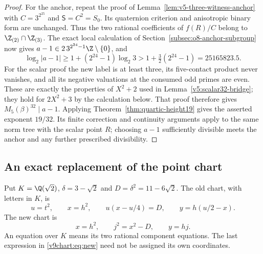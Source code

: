 \begin{proof}
For the anchor, repeat the proof of
Lemma~\ref{lem:v5-three-witness-anchor} with $C=3^{2^{25}}$ and
$\mathsf S=C^2=S_0$. Its quaternion criterion and anisotropic
binary form are unchanged. Thus the two rational coefficients of
$f(R)/C$ belong to $\Z_{(2)}\cap\Z_{(3)}$. The exact local calculation
of Section~\ref{subsec:o8-anchor-subgroup} now gives
$a-1\in2\,3^{2^{24}-1}\Z\setminus\{0\}$, and
\[
 \log_2|a-1|\ge1+(2^{24}-1)\log_2 3
 >1+\tfrac32(2^{24}-1)=25165823.5.
\]
For the scalar proof the new label is at least three, its five-contact
product never vanishes, and all its negative valuations at the
consumed odd primes are even. These are exactly the properties of
$X^2+2$ used in Lemma~\ref{v5:scalar32-bridge}; they hold for
$2X^2+3$ by the calculation below. That proof therefore gives
$M_5(\beta)^{32}\mid a-1$. Applying
Theorem~\ref{thm:quartic-height19} gives the asserted exponent $19/32$.
Its finite correction and continuity arguments apply to the same
norm tree with the scalar point $R$; choosing $a-1$ sufficiently
divisible meets the anchor and any further prescribed divisibility.
\end{proof}


\subsection{An exact replacement of the point chart}
Put $K=\Q(\sqrt2)$, $\delta=3-\sqrt2$ and $D=\delta^2=11-6\sqrt2$. The old chart, with letters in $K$, is
\begin{equation}\label{v9chart:eq:old}
 u=t^2,\qquad x=h^2,\qquad u(x-u/4)=D,\qquad y=h(u/2-x).
\end{equation}
The new chart is
\begin{equation}\label{v9chart:eq:new}
 x=h^2,\qquad j^2=x^2-D,\qquad y=hj.
\end{equation}
An equation over $K$ means its two rational component equations. The last expression in \eqref{v9chart:eq:new} need not be assigned its own coordinates.

